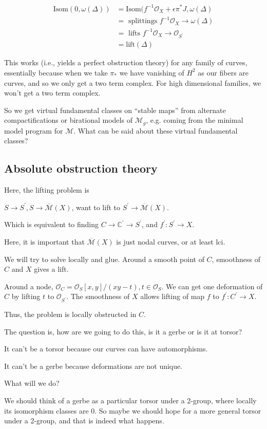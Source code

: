 \documentclass{amsart}
\theoremstyle{definition}
\newcommand{\OO}{\mathcal{O}}
\newcommand{\Mbar}{\overline{\mathcal{M}}}
\newcommand{\M}{\mathcal{M}}
\newcommand{\C}{\mathbb{C}}
\begin{document}
\begin{align*}
\text{Isom}(0,\omega(\Delta))&=\text{Isom}(f^{-1}\OO_X+\epsilon\pi^*J,\omega(\Delta) \\
&= \text{ splittings } f^{-1}\OO_X\to \omega(\Delta) \\
&= \text{ lifts } f^{-1}\OO_X\to \OO_{S^\prime} \\
&= \text{lift}(\Delta)
\end{align*}


This works (i.e., yields a perfect obstruction theory) for any family of curves, essentially because when we take $\pi_*$ we have vanishing of $H^2$ as our fibers are curves, and so we only get a two term complex.  For high dimensional families, we won't get a two term complex.

So we get virtual fundamental classes on ``stable maps'' from alternate compactifications or birational models of $\M_g$, e.g. coming from the minimal model program for $\M$.  What can be said about these virtual fundamental classes?

\subsection{Absolute obstruction theory}
Here, the lifting problem is

$S\to S^\prime, S\to \Mbar(X)$, want to lift to $S^\prime \to \Mbar(X)$.

Which is equivalent to finding $C\to \C^\prime \to S^\prime$, and $f^\prime:S^\prime \to X$.

Here, it is important that $\Mbar(X)$ is just nodal curves, or at least lci.

We will try to solve locally and glue.  Around a smooth point of $C$, smoothness of $C$ and $X$ gives a lift.

Around a node, $\OO_C=\OO_S[x,y]/(xy-t), t\in\OO_S$.  We can get one deformation of $C$ by lifting $t$ to $\OO_{S^\prime}$.  The smoothness of $X$ allows lifting of map $f$ to $f^\prime:C^\prime\to X$.

Thus, the problem is locally obstructed in $C$.

The question is, how are we going to do this, is it a gerbe or is it at torsor? 

 It can't be a torsor because our curves can have automorphisms.

It can't be a gerbe because deformations are not unique.

What will we do?

We should think of a gerbe as a particular torsor under a 2-group, where locally its isomorphism classes are 0.  So maybe we should hope for a more general torsor under a 2-group, and that is indeed what happens.
\end{document}

